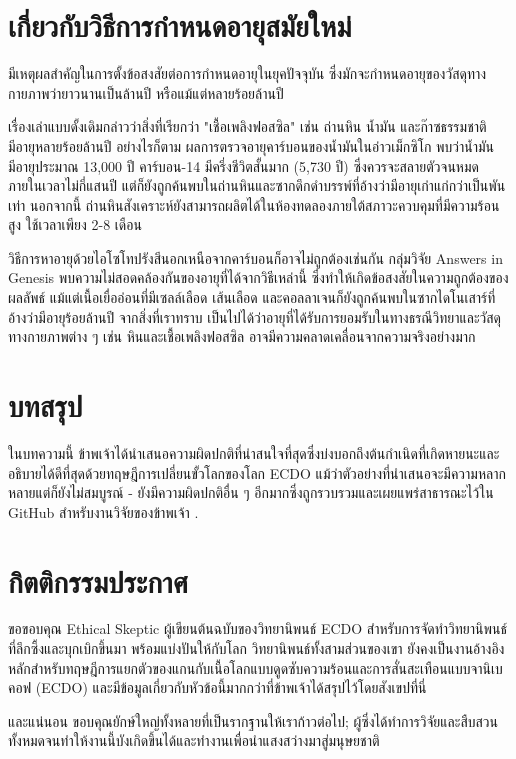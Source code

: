 \documentclass[10pt,twocolumn,letterpaper]{article}
\begin{document}
\section{เกี่ยวกับวิธีการกำหนดอายุสมัยใหม่}

มีเหตุผลสำคัญในการตั้งข้อสงสัยต่อการกำหนดอายุในยุคปัจจุบัน ซึ่งมักจะกำหนดอายุของวัสดุทางกายภาพว่ายาวนานเป็นล้านปี หรือแม้แต่หลายร้อยล้านปี

เรื่องเล่าแบบดั้งเดิมกล่าวว่าสิ่งที่เรียกว่า "เชื้อเพลิงฟอสซิล" เช่น ถ่านหิน น้ำมัน และก๊าซธรรมชาติ มีอายุหลายร้อยล้านปี \cite{104} อย่างไรก็ตาม ผลการตรวจอายุคาร์บอนของน้ำมันในอ่าวเม็กซิโก พบว่าน้ำมันมีอายุประมาณ 13,000 ปี \cite{105} คาร์บอน-14 มีครึ่งชีวิตสั้นมาก (5,730 ปี) ซึ่งควรจะสลายตัวจนหมดภายในเวลาไม่กี่แสนปี แต่ก็ยังถูกค้นพบในถ่านหินและซากดึกดำบรรพ์ที่อ้างว่ามีอายุเก่าแก่กว่าเป็นพันเท่า \cite{106} นอกจากนี้ ถ่านหินสังเคราะห์ยังสามารถผลิตได้ในห้องทดลองภายใต้สภาวะควบคุมที่มีความร้อนสูง ใช้เวลาเพียง 2-8 เดือน \cite{107}

วิธีการหาอายุด้วยไอโซโทปรังสีนอกเหนือจากคาร์บอนก็อาจไม่ถูกต้องเช่นกัน กลุ่มวิจัย Answers in Genesis พบความไม่สอดคล้องกันของอายุที่ได้จากวิธีเหล่านี้ ซึ่งทำให้เกิดข้อสงสัยในความถูกต้องของผลลัพธ์ \cite{108} แม้แต่เนื้อเยื่ออ่อนที่มีเซลล์เลือด เส้นเลือด และคอลลาเจนก็ยังถูกค้นพบในซากไดโนเสาร์ที่อ้างว่ามีอายุร้อยล้านปี \cite{109,110} จากสิ่งที่เราทราบ เป็นไปได้ว่าอายุที่ได้รับการยอมรับในทางธรณีวิทยาและวัสดุทางกายภาพต่าง ๆ เช่น หินและเชื้อเพลิงฟอสซิล อาจมีความคลาดเคลื่อนจากความจริงอย่างมาก

\section{บทสรุป}

ในบทความนี้ ข้าพเจ้าได้นำเสนอความผิดปกติที่น่าสนใจที่สุดซึ่งบ่งบอกถึงต้นกำเนิดที่เกิดหายนะและอธิบายได้ดีที่สุดด้วยทฤษฎีการเปลี่ยนขั้วโลกของโลก ECDO แม้ว่าตัวอย่างที่นำเสนอจะมีความหลากหลายแต่ก็ยังไม่สมบูรณ์ - ยังมีความผิดปกติอื่น ๆ อีกมากซึ่งถูกรวบรวมและเผยแพร่สาธารณะไว้ใน GitHub สำหรับงานวิจัยของข้าพเจ้า \cite{2}.

\section{กิตติกรรมประกาศ}

ขอขอบคุณ Ethical Skeptic ผู้เขียนต้นฉบับของวิทยานิพนธ์ ECDO สำหรับการจัดทำวิทยานิพนธ์ที่ลึกซึ้งและบุกเบิกขึ้นมา พร้อมแบ่งปันให้กับโลก วิทยานิพนธ์ทั้งสามส่วนของเขา \cite{1} ยังคงเป็นงานอ้างอิงหลักสำหรับทฤษฎีการแยกตัวของแกนกับเนื้อโลกแบบดูดซับความร้อนและการสั่นสะเทือนแบบจานิเบคอฟ (ECDO) และมีข้อมูลเกี่ยวกับหัวข้อนี้มากกว่าที่ข้าพเจ้าได้สรุปไว้โดยสังเขปที่นี่

และแน่นอน ขอบคุณยักษ์ใหญ่ทั้งหลายที่เป็นรากฐานให้เราก้าวต่อไป; ผู้ซึ่งได้ทำการวิจัยและสืบสวนทั้งหมดจนทำให้งานนี้บังเกิดขึ้นได้และทำงานเพื่อนำแสงสว่างมาสู่มนุษยชาติ

\clearpage
\twocolumn

{\small
\renewcommand{\refname}{บรรณานุกรม}


}
\end{document}
